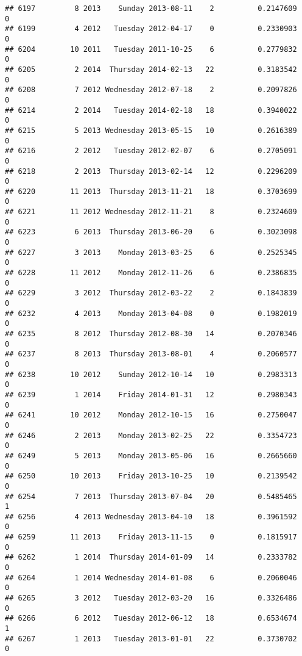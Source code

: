 \documentclass[
]{article}
\begin{document}
\begin{verbatim}
## 6197         8 2013    Sunday 2013-08-11    2          0.2147609             0
## 6199         4 2012   Tuesday 2012-04-17    0          0.2330903             0
## 6204        10 2011   Tuesday 2011-10-25    6          0.2779832             0
## 6205         2 2014  Thursday 2014-02-13   22          0.3183542             0
## 6208         7 2012 Wednesday 2012-07-18    2          0.2097826             0
## 6214         2 2014   Tuesday 2014-02-18   18          0.3940022             0
## 6215         5 2013 Wednesday 2013-05-15   10          0.2616389             0
## 6216         2 2012   Tuesday 2012-02-07    6          0.2705091             0
## 6218         2 2013  Thursday 2013-02-14   12          0.2296209             0
## 6220        11 2013  Thursday 2013-11-21   18          0.3703699             0
## 6221        11 2012 Wednesday 2012-11-21    8          0.2324609             0
## 6223         6 2013  Thursday 2013-06-20    6          0.3023098             0
## 6227         3 2013    Monday 2013-03-25    6          0.2525345             0
## 6228        11 2012    Monday 2012-11-26    6          0.2386835             0
## 6229         3 2012  Thursday 2012-03-22    2          0.1843839             0
## 6232         4 2013    Monday 2013-04-08    0          0.1982019             0
## 6235         8 2012  Thursday 2012-08-30   14          0.2070346             0
## 6237         8 2013  Thursday 2013-08-01    4          0.2060577             0
## 6238        10 2012    Sunday 2012-10-14   10          0.2983313             0
## 6239         1 2014    Friday 2014-01-31   12          0.2980343             0
## 6241        10 2012    Monday 2012-10-15   16          0.2750047             0
## 6246         2 2013    Monday 2013-02-25   22          0.3354723             0
## 6249         5 2013    Monday 2013-05-06   16          0.2665660             0
## 6250        10 2013    Friday 2013-10-25   10          0.2139542             0
## 6254         7 2013  Thursday 2013-07-04   20          0.5485465             1
## 6256         4 2013 Wednesday 2013-04-10   18          0.3961592             0
## 6259        11 2013    Friday 2013-11-15    0          0.1815917             0
## 6262         1 2014  Thursday 2014-01-09   14          0.2333782             0
## 6264         1 2014 Wednesday 2014-01-08    6          0.2060046             0
## 6265         3 2012   Tuesday 2012-03-20   16          0.3326486             0
## 6266         6 2012   Tuesday 2012-06-12   18          0.6534674             1
## 6267         1 2013   Tuesday 2013-01-01   22          0.3730702             0

\end{verbatim}
\end{document}
